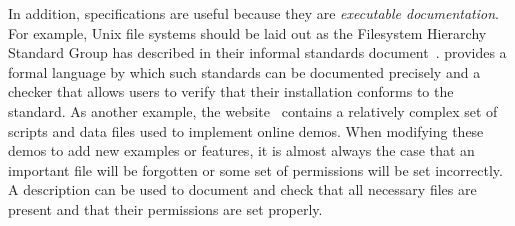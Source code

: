 In addition, 
\forest{} specifications are useful because they are {\em executable 
documentation}.  For example, Unix file
systems should be laid out as the
Filesystem Hierarchy Standard Group has described in their informal
standards document~\cite{fsh}.  \forest{} provides a formal language
by which such standards can be documented precisely and
a checker that allows users to verify that their installation
conforms to the standard. As another example, the 
\pads{} website~\cite{padsweb}
contains a relatively complex set of scripts and data files used to
implement online demos.  
When modifying these demos to add new examples
or features, it is almost always the case that an important
file will be forgotten or some set of permissions will be set incorrectly.
A \forest{} description can be used to document and check that
all necessary files are present and that their permissions are set properly.

